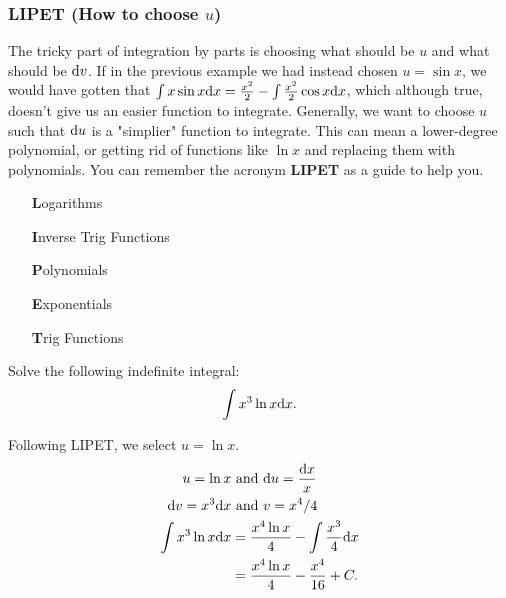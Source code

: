 \subsubsection{LIPET (How to choose $u$)}
The tricky part of integration by parts is choosing what should be $u$ and what should be $\mathrm{d} v$.
If in the previous example we had instead chosen $u=\sin{x}$, we would have gotten that $\int{x\sin{x}\mathrm{d} x} = \frac{x^2}{2}-\int{\frac{x^2}{2}\cos{x}\mathrm{d} x}$, which although true, doesn't give us an easier function to integrate.
Generally, we want to choose $u$ such that $\mathrm{d} u$ is a "simplier" function to integrate.
This can mean a lower-degree polynomial, or getting rid of functions like $\ln{x}$ and replacing them with polynomials.
You can remember the acronym \textbf{LIPET} as a guide to help you.
\begin{itemize}[align=left, leftmargin=0.66in]
	\item[\textbf{L}ogarithms]
	\item[\textbf{I}nverse Trig Functions]
	\item[\textbf{P}olynomials]
	\item[\textbf{E}xponentials]
	\item[\textbf{T}rig Functions]
\end{itemize}

\begin{example}
	Solve the following indefinite integral:
	\begin{equation*}
		\int{x^3\ln{x}\mathrm{d} x}.
	\end{equation*}
\end{example}
Following LIPET, we select $u = \ln{x}$.
\begin{align*}
	u = \ln{x} &\text{ and } \mathrm{d} u = \frac{\mathrm{d} x}{x} \\
	\mathrm{d} v = x^3\mathrm{d} x &\text{ and } v = x^4/4 \\
	\int{x^3\ln{x}\mathrm{d} x} &= \frac{x^4\ln{x}}{4} - \int{\frac{x^3}{4}\mathrm{d} x} \\
	&= \frac{x^4\ln{x}}{4} - \frac{x^4}{16} + C.
\end{align*}


